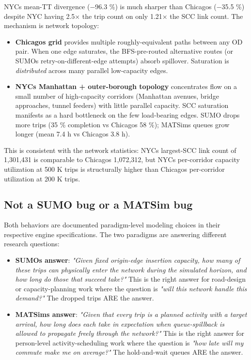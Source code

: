 NYC\textquotesingle s mean-TT divergence (−96.3 \%) is much sharper than
Chicago\textquotesingle s (−35.5 \%) despite NYC having 2.5× the trip
count on only 1.21× the SCC link count. The mechanism is network
topology:

\begin{itemize}
\tightlist
\item
  \textbf{Chicago\textquotesingle s grid} provides multiple
  roughly-equivalent paths between any OD pair. When one edge saturates,
  the BFS-pre-routed alternative routes (or SUMO\textquotesingle s
  retry-on-different-edge attempts) absorb spillover. Saturation is
  \emph{distributed} across many parallel low-capacity edges.
\item
  \textbf{NYC\textquotesingle s Manhattan + outer-borough topology}
  concentrates flow on a small number of high-capacity corridors
  (Manhattan avenues, bridge approaches, tunnel feeders) with little
  parallel capacity. SCC saturation manifests as a hard bottleneck on
  the few load-bearing edges. SUMO drops more trips (35 \% completion vs
  Chicago\textquotesingle s 58 \%); MATSim\textquotesingle s queues grow
  longer (mean 7.4 h vs Chicago\textquotesingle s 3.8 h).
\end{itemize}

This is consistent with the network statistics: NYC\textquotesingle s
largest-SCC link count of 1,301,431 is comparable to
Chicago\textquotesingle s 1,072,312, but NYC\textquotesingle s
per-corridor capacity utilization at 500 K trips is structurally higher
than Chicago\textquotesingle s per-corridor utilization at 200 K trips.

\subsection{Not a SUMO bug or a MATSim
bug}\label{not-a-sumo-bug-or-a-matsim-bug}

Both behaviors are documented paradigm-level modeling choices in their
respective engine specifications. The two paradigms are answering
different research questions:

\begin{itemize}
\tightlist
\item
  \textbf{SUMO\textquotesingle s answer}: \emph{"Given fixed origin-edge
  insertion capacity, how many of these trips can physically enter the
  network during the simulated horizon, and how long do those that
  succeed take?"} This is the right answer for road-design or
  capacity-planning work where the question is \emph{"will this network
  handle this demand?"} The dropped trips ARE the answer.
\item
  \textbf{MATSim\textquotesingle s answer}: \emph{"Given that every trip
  is a planned activity with a target arrival, how long does each take
  in expectation when queue-spillback is allowed to propagate freely
  through the network?"} This is the right answer for person-level
  activity-scheduling work where the question is \emph{"how late will my
  commute make me on average?"} The hold-and-wait queues ARE the answer.
\end{itemize}


